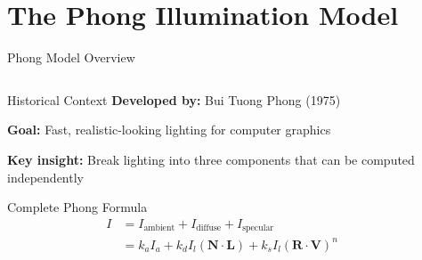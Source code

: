 \section{The Phong Illumination Model}

\begin{frame}{Phong Model Overview}
    \begin{columns}
        \begin{column}{0.5\textwidth}
            \begin{conceptbox}{Historical Context}
                \textbf{Developed by:} Bui Tuong Phong (1975)
                
                \textbf{Goal:} Fast, realistic-looking lighting for computer graphics
                
                \vspace{0.3cm}
                \textbf{Key insight:} Break lighting into three components that can be computed independently
            \end{conceptbox}
            
            \vspace{0.3cm}
            \pause
            \begin{mathbox}{Complete Phong Formula}
                \begin{align}
                    I &= I_{\text{ambient}} + I_{\text{diffuse}} + I_{\text{specular}} \\
                    &= k_a I_a + k_d I_l (\mathbf{N} \cdot \mathbf{L}) + k_s I_l (\mathbf{R} \cdot \mathbf{V})^n
                \end{align}
            \end{mathbox}
        \end{column}
        \begin{column}{0.5\textwidth}
\end{column}
\end{columns}
\end{frame}
